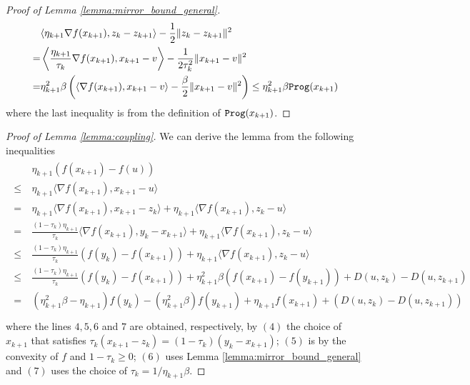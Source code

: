 \begin{proof}[Proof of Lemma \ref{lemma:mirror_bound_general}]
\begin{align*}
     \begin{aligned}
        &\langle \eta_{k+1} \nabla f(x_{k+1}), z_k - z_{k+1} \rangle - \frac{1}{2}\|z_k - z_{k+1}\|^2  \\
        = & \left\langle \frac{\eta_{k+1}}{\tau_k} \nabla f(x_{k+1}), x_{k+1} - v \right\rangle - \frac{1}{2\tau_k^2} \|x_{k+1} - v \|^2 \\
        = & \eta_{k+1}^2 \beta \left( \langle \nabla f(x_{k+1}), x_{k+1} -v \rangle - \frac{\beta}{2} \|x_{k+1} - v\|^2\right) \leq \eta_{k+1}^2 \beta {\tt{Prog}}(x_{k+1})
    \end{aligned}
\end{align*}
where the last inequality is from the definition of ${\tt{Prog}}(x_{k+1})$.

\end{proof}


\begin{proof}[Proof of Lemma \ref{lemma:coupling}]
We can derive the lemma from the following inequalities
\begin{align}
    \begin{aligned}
        &\ \eta_{k+1}(f(x_{k+1}) -f(u)) \\
        \leq &\ \eta_{k+1} \langle \nabla f(x_{k+1}), x_{k+1} -u \rangle \\
        = &\ \eta_{k+1} \langle \nabla f(x_{k+1}), x_{k+1} -z_{k} \rangle + \eta_{k+1} \langle \nabla f(x_{k+1}), z_k -u \rangle \\
        = &\ \frac{(1-\tau_k)\eta_{k+1}}{\tau_k} \langle \nabla f(x_{k+1}), y_k - x_{k+1} \rangle + \eta_{k+1} \langle \nabla f(x_{k+1}), z_k - u \rangle \\
        \leq &\ \frac{(1-\tau_k)\eta_{k+1}}{\tau_k}(f(y_k)-f(x_{k+1})) + \eta_{k+1} \langle \nabla f(x_{k+1}), z_k-u \rangle \\
        \leq &\ \frac{(1-\tau_k)\eta_{k+1}}{\tau_k}(f(y_k)-f(x_{k+1})) + \eta_{k+1}^2 \beta (f(x_{k+1}) - f(y_{k+1}))  + D(u, {z_k}) - D(u, z_{k+1})\\
            = &\ (\eta_{k+1}^2\beta -\eta_{k+1})f(y_k) -(\eta_{k+1}^2 \beta)f(y_{k+1})  +\eta_{k+1}f(x_{k+1})   + \left( D(u, {z_k}) - D(u, z_{k+1})\right)\\
    \end{aligned}
\end{align}
where the lines $4,5,6$ and $7$ are obtained, respectively, by $(4)$ the choice of $x_{k+1}$ that satisfies $\tau_k(x_{k+1} - z_k) = (1-\tau_k) (y_k - x_{k+1})$; $(5)$ is by the convexity of $f$ and $1-\tau_k \geq 0$; $(6)$ uses Lemma \ref{lemma:mirror_bound_general} and $(7)$ uses the choice of $\tau_k = 1/\eta_{k+1}\beta$.
\end{proof}

